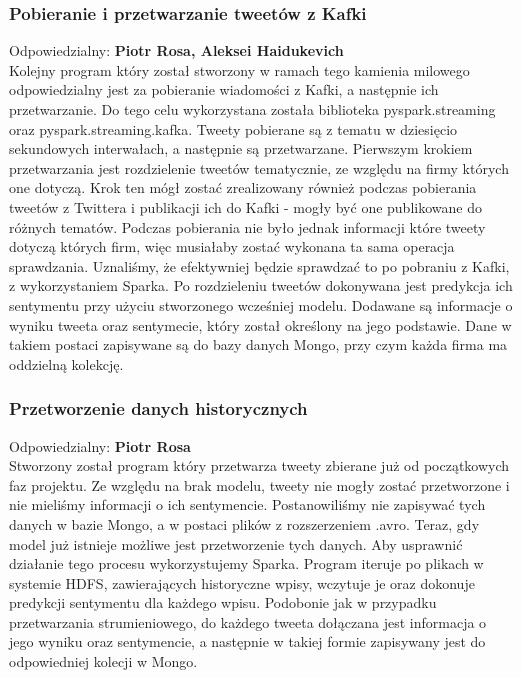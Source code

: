\documentclass[a4paper,11pt, notitlepage ]{article}
\begin{document}
    \subsubsection{Pobieranie i przetwarzanie tweetów z Kafki}
    Odpowiedzialny: \textbf{Piotr Rosa, Aleksei Haidukevich}\\
    Kolejny program który został stworzony w ramach tego kamienia milowego odpowiedzialny jest za pobieranie wiadomości z Kafki, a następnie ich przetwarzanie. Do tego celu wykorzystana została biblioteka pyspark.streaming oraz pyspark.streaming.kafka. Tweety pobierane są z tematu w dziesięcio sekundowych interwałach, a następnie są przetwarzane. Pierwszym krokiem przetwarzania jest rozdzielenie tweetów tematycznie, ze względu na firmy których one dotyczą. Krok ten mógł zostać zrealizowany również podczas pobierania tweetów z Twittera i publikacji ich do Kafki - mogły być one publikowane do różnych tematów. Podczas pobierania nie było jednak informacji które tweety dotyczą których firm, więc musiałaby zostać wykonana ta sama operacja sprawdzania. Uznaliśmy, że efektywniej będzie sprawdzać to po pobraniu z Kafki, z wykorzystaniem Sparka. Po rozdzieleniu tweetów dokonywana jest predykcja ich sentymentu przy użyciu stworzonego wcześniej modelu. Dodawane są informacje o wyniku tweeta oraz sentymecie, który został określony na jego podstawie. Dane w takiem postaci zapisywane są do bazy danych Mongo, przy czym każda firma ma oddzielną kolekcję.
    
    \subsubsection{Przetworzenie danych historycznych}
    Odpowiedzialny: \textbf{Piotr Rosa}\\
    Stworzony został program który przetwarza tweety zbierane już od początkowych faz projektu. Ze względu na brak modelu, tweety nie mogły zostać przetworzone i nie mieliśmy informacji o ich sentymencie. Postanowiliśmy nie zapisywać tych danych w bazie Mongo, a w postaci plików z rozszerzeniem .avro. Teraz, gdy model już istnieje możliwe jest przetworzenie tych danych. Aby usprawnić działanie tego procesu wykorzystujemy Sparka. Program iteruje po plikach w systemie HDFS, zawierających historyczne wpisy, wczytuje je oraz dokonuje predykcji sentymentu dla każdego wpisu. Podobonie jak w przypadku przetwarzania strumieniowego, do każdego tweeta dołączana jest informacja o jego wyniku oraz sentymencie, a następnie w takiej formie zapisywany jest do odpowiedniej kolecji w Mongo.
    
\end{document}
